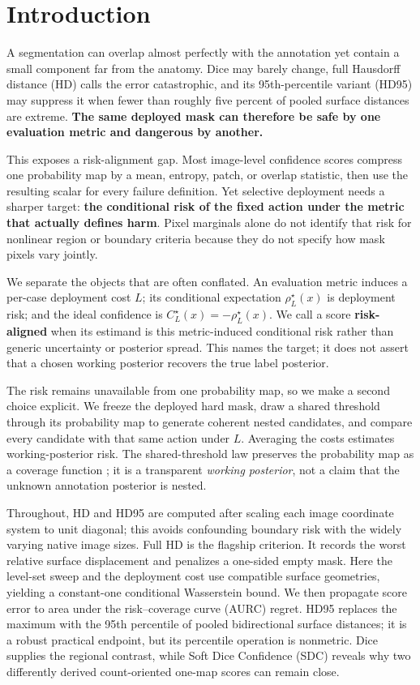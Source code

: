 \section{Introduction}
\label{sec:introduction}

A segmentation can overlap almost perfectly with the annotation yet contain a
small component far from the anatomy. Dice may barely change, full Hausdorff
distance (HD) calls the error catastrophic, and its 95th-percentile variant
(HD95) may suppress it when fewer than roughly five percent of pooled surface
distances are extreme. \textbf{The same deployed mask can therefore be safe by
one evaluation metric and dangerous by another.}

This exposes a risk-alignment gap. Most image-level confidence scores compress
one probability map by a mean, entropy, patch, or overlap statistic, then use
the resulting scalar for every failure definition. Yet selective deployment
needs a sharper target: \textbf{the conditional risk of the fixed action under
the metric that actually defines harm}. Pixel marginals alone do not identify
that risk for nonlinear region or boundary criteria because they do not specify
how mask pixels vary jointly.

We separate the objects that are often conflated. An evaluation metric induces
a per-case deployment cost \(L\); its conditional expectation
\(\rho_L^\star(x)\) is deployment risk; and the ideal confidence is
\(C_L^\star(x)=-\rho_L^\star(x)\). We call a score \textbf{risk-aligned} when
its estimand is this metric-induced conditional risk rather than generic
uncertainty or posterior spread. This names the target; it does not assert that
a chosen working posterior recovers the true label posterior.

The risk remains unavailable from one probability map, so we make a second
choice explicit. We freeze the deployed hard mask, draw a shared threshold
through its probability map to generate coherent nested candidates, and compare
every candidate with that same action under \(L\). Averaging the costs estimates
working-posterior risk. The shared-threshold law preserves the probability map
as a coverage function \citep{goodman,molchanov}; it is a transparent
\emph{working posterior}, not a claim that the unknown annotation posterior is
nested.

Throughout, HD and HD95 are computed after scaling each image coordinate system
to unit diagonal; this avoids confounding boundary risk with the widely varying
native image sizes. Full HD is the flagship criterion. It records the worst
relative surface displacement and penalizes a one-sided empty mask.
Here the level-set sweep and the deployment cost use compatible surface
geometries, yielding a constant-one conditional Wasserstein bound. We then
propagate score
error to area under the risk--coverage curve (AURC) regret. HD95 replaces the maximum with the 95th percentile of pooled
bidirectional surface distances; it is a robust practical endpoint, but its
percentile operation is nonmetric. Dice supplies the regional contrast, while
Soft Dice Confidence (SDC) reveals why two differently derived count-oriented
one-map scores can remain close.

